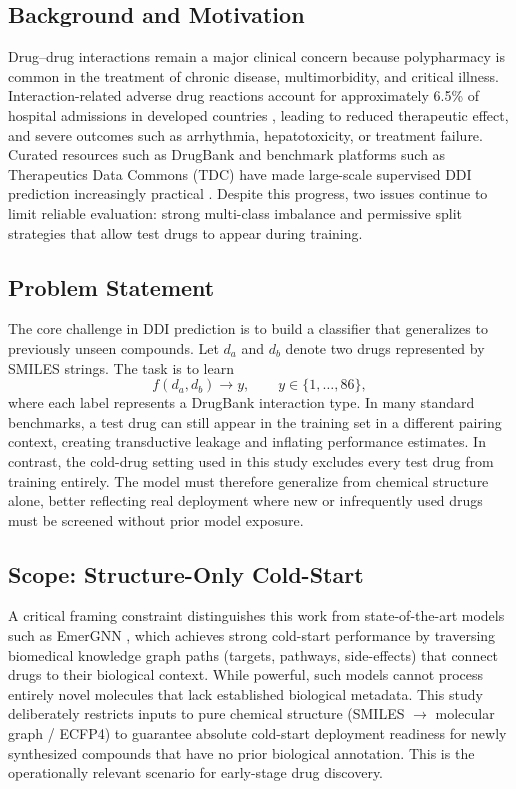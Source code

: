\documentclass[11pt,a4paper,twocolumn]{article}
\begin{document}
\subsection{Background and Motivation}
Drug--drug interactions remain a major clinical concern because polypharmacy is common
in the treatment of chronic disease, multimorbidity, and critical illness.
Interaction-related adverse drug reactions account for approximately 6.5\% of hospital
admissions in developed countries \cite{wishart2018drugbank}, leading to reduced
therapeutic effect, and severe outcomes such as arrhythmia, hepatotoxicity, or
treatment failure.
Curated resources such as DrugBank and benchmark platforms such as Therapeutics Data
Commons (TDC) have made large-scale supervised DDI prediction increasingly practical
\cite{wishart2018drugbank, huang2021tdc}.
Despite this progress, two issues continue to limit reliable evaluation: strong
multi-class imbalance and permissive split strategies that allow test drugs to appear
during training.

\subsection{Problem Statement}
The core challenge in DDI prediction is to build a classifier that generalizes to
previously unseen compounds.
Let $d_a$ and $d_b$ denote two drugs represented by SMILES strings.
The task is to learn
\begin{equation}
  f(d_a, d_b) \rightarrow y, \qquad y \in \{1,\dots,86\},
\end{equation}
where each label represents a DrugBank interaction type.
In many standard benchmarks, a test drug can still appear in the training set in a
different pairing context, creating transductive leakage and inflating performance
estimates.
In contrast, the cold-drug setting used in this study excludes every test drug from
training entirely.
The model must therefore generalize from chemical structure alone, better reflecting
real deployment where new or infrequently used drugs must be screened without prior
model exposure.

\subsection{Scope: Structure-Only Cold-Start}
A critical framing constraint distinguishes this work from state-of-the-art models
such as EmerGNN \cite{zhang2023emergnn}, which achieves strong cold-start performance
by traversing biomedical knowledge graph paths (targets, pathways, side-effects) that
connect drugs to their biological context.
While powerful, such models cannot process entirely novel molecules that lack
established biological metadata.
This study deliberately restricts inputs to pure chemical structure
(SMILES $\to$ molecular graph / ECFP4) to guarantee absolute cold-start deployment
readiness for newly synthesized compounds that have no prior biological annotation.
This is the operationally relevant scenario for early-stage drug discovery.
\end{document}
